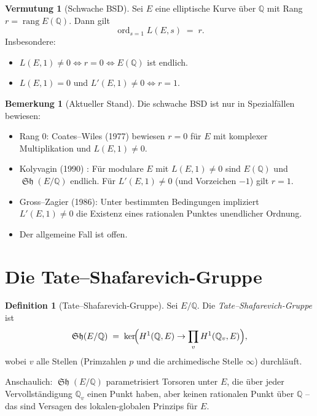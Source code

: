 \documentclass[12pt,a4paper]{amsart}
\theoremstyle{definition}
\newtheorem{definition}[theorem]{Definition}
\newtheorem{remark}[theorem]{Bemerkung}
\newtheorem{conjecture}[theorem]{Vermutung}
\newcommand{\Q}{\mathbb{Q}}
\DeclareMathOperator{\ord}{ord}
\DeclareMathOperator{\Sha}{\mathfrak{Sh}}
\DeclareMathOperator{\rang}{rang}
\begin{document}
\begin{conjecture}[Schwache BSD]
\label{conj:weak_bsd}
Sei $E$ eine elliptische Kurve \"uber $\Q$ mit Rang $r = \rang E(\Q)$.
Dann gilt
\[
  \ord_{s=1} L(E,s) \;=\; r.
\]
Insbesondere:
\begin{itemize}
  \item $L(E,1) \ne 0 \iff r = 0 \iff E(\Q)$ ist endlich.
  \item $L(E,1) = 0$ und $L'(E,1) \ne 0 \iff r = 1$.
\end{itemize}
\end{conjecture}

\begin{remark}[Aktueller Stand]
Die schwache BSD ist nur in Spezialf\"allen bewiesen:
\begin{itemize}
  \item Rang $0$: Coates--Wiles (1977) \cite{CoatesWiles1977} bewiesen $r=0$
    f\"ur $E$ mit komplexer Multiplikation und $L(E,1) \ne 0$.
  \item Kolyvagin (1990) \cite{Kolyvagin1990}: F\"ur modulare $E$ mit
    $L(E,1) \ne 0$ sind $E(\Q)$ und $\Sha(E/\Q)$ endlich.
    F\"ur $L'(E,1) \ne 0$ (und Vorzeichen $-1$) gilt $r = 1$.
  \item Gross--Zagier (1986): Unter bestimmten Bedingungen impliziert
    $L'(E,1) \ne 0$ die Existenz eines rationalen Punktes unendlicher Ordnung.
  \item Der allgemeine Fall ist offen.
\end{itemize}
\end{remark}

\section{Die Tate--Shafarevich-Gruppe}

\begin{definition}[Tate--Shafarevich-Gruppe]
\label{def:sha}
Sei $E/\Q$. Die \emph{Tate--Shafarevich-Gruppe} ist
\[
  \Sha(E/\Q) \;=\; \ker\!\Bigl(H^1(\Q, E) \to \prod_v H^1(\Q_v, E)\Bigr),
\]
wobei $v$ alle Stellen (Primzahlen $p$ und die archimedische Stelle $\infty$)
durchl\"auft.

Anschaulich: $\Sha(E/\Q)$ parametrisiert Torsoren unter $E$, die \"uber
jeder Vervollst\"andigung $\Q_v$ einen Punkt haben, aber keinen rationalen
Punkt \"uber $\Q$ -- das sind Versagen des lokalen-globalen Prinzips f\"ur $E$.
\end{definition}
\end{document}
